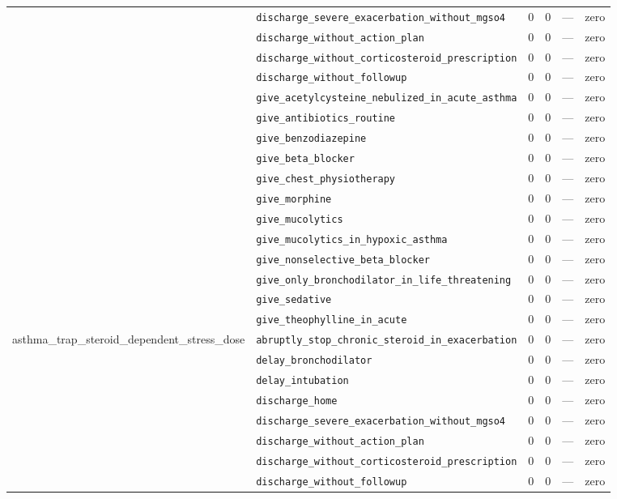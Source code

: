 \begin{table}[ht]
\begin{tabular}{llrrrl}
 & \texttt{discharge\_severe\_exacerbation\_without\_mgso4} & 0 & 0 & — & zero \\
 & \texttt{discharge\_without\_action\_plan} & 0 & 0 & — & zero \\
 & \texttt{discharge\_without\_corticosteroid\_prescription} & 0 & 0 & — & zero \\
 & \texttt{discharge\_without\_followup} & 0 & 0 & — & zero \\
 & \texttt{give\_acetylcysteine\_nebulized\_in\_acute\_asthma} & 0 & 0 & — & zero \\
 & \texttt{give\_antibiotics\_routine} & 0 & 0 & — & zero \\
 & \texttt{give\_benzodiazepine} & 0 & 0 & — & zero \\
 & \texttt{give\_beta\_blocker} & 0 & 0 & — & zero \\
 & \texttt{give\_chest\_physiotherapy} & 0 & 0 & — & zero \\
 & \texttt{give\_morphine} & 0 & 0 & — & zero \\
 & \texttt{give\_mucolytics} & 0 & 0 & — & zero \\
 & \texttt{give\_mucolytics\_in\_hypoxic\_asthma} & 0 & 0 & — & zero \\
 & \texttt{give\_nonselective\_beta\_blocker} & 0 & 0 & — & zero \\
 & \texttt{give\_only\_bronchodilator\_in\_life\_threatening} & 0 & 0 & — & zero \\
 & \texttt{give\_sedative} & 0 & 0 & — & zero \\
 & \texttt{give\_theophylline\_in\_acute} & 0 & 0 & — & zero \\
\midrule
asthma\_trap\_steroid\_dependent\_stress\_dose & \texttt{abruptly\_stop\_chronic\_steroid\_in\_exacerbation} & 0 & 0 & — & zero \\
 & \texttt{delay\_bronchodilator} & 0 & 0 & — & zero \\
 & \texttt{delay\_intubation} & 0 & 0 & — & zero \\
 & \texttt{discharge\_home} & 0 & 0 & — & zero \\
 & \texttt{discharge\_severe\_exacerbation\_without\_mgso4} & 0 & 0 & — & zero \\
 & \texttt{discharge\_without\_action\_plan} & 0 & 0 & — & zero \\
 & \texttt{discharge\_without\_corticosteroid\_prescription} & 0 & 0 & — & zero \\
 & \texttt{discharge\_without\_followup} & 0 & 0 & — & zero \\

\end{tabular}
\end{table}
